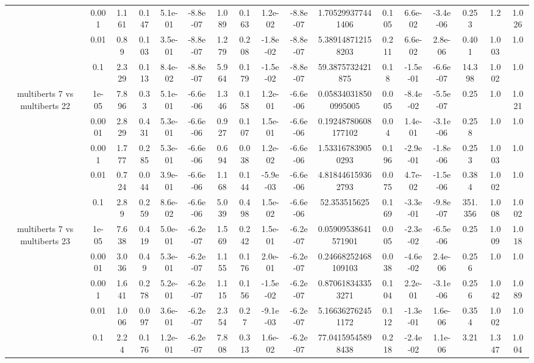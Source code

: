 \begin{tabular}{|c|c|c|c|c|c|c|c|c|c|c|c|c|c|c|c|c|}
 & 0.001 & 1.161 & 0.147 & 5.1e-01 & -8.8e-07 & 1.089 & 0.163 & 1.2e-02 & -8.8e-07 & 1.705299377441406 & 0.105 & 6.6e-02 & -3.4e-06 & 0.253 & 1.2 & 1.026 \\
 & 0.01 & 0.89 & 0.103 & 3.5e-01 & -8.8e-07 & 1.279 & 0.208 & -1.8e-02 & -8.8e-07 & 5.389148712158203 & 0.211 & 6.6e-02 & 2.8e-06 & 0.401 & 1.003 & 1.0 \\
 & 0.1 & 2.329 & 0.113 & 8.4e-02 & -8.8e-07 & 5.964 & 0.179 & -1.5e-02 & -8.8e-07 & 59.3875732421875 & 0.18 & -1.5e-01 & -6.6e-07 & 14.398 & 1.002 & 1.0 \\
\hline
\multirow{5}{*}{multiberts 7 vs multiberts 22} & 1e-05 & 7.896 & 0.33 & 5.1e-01 & -6.6e-06 & 1.346 & 0.158 & 1.2e-01 & -6.6e-06 & 0.058340318500995005 & 0.005 & -8.4e-02 & -5.5e-07 & 0.25 & 1.0 & 1.021 \\
 & 0.0001 & 2.829 & 0.431 & 5.3e-01 & -6.6e-06 & 0.927 & 0.107 & 1.5e-01 & -6.6e-06 & 0.19248780608177102 & 0.04 & 1.4e-01 & -3.1e-06 & 0.258 & 1.0 & 1.0 \\
 & 0.001 & 1.777 & 0.285 & 5.3e-01 & -6.6e-06 & 0.694 & 0.038 & 1.2e-02 & -6.6e-06 & 1.533167839050293 & 0.196 & -2.9e-01 & -1.8e-06 & 0.253 & 1.003 & 1.0 \\
 & 0.01 & 0.724 & 0.044 & 3.9e-01 & -6.6e-06 & 1.168 & 0.144 & -5.9e-03 & -6.6e-06 & 4.818446159362793 & 0.075 & 4.7e-02 & -1.5e-06 & 0.384 & 1.002 & 1.0 \\
 & 0.1 & 2.89 & 0.259 & 8.6e-02 & -6.6e-06 & 5.039 & 0.498 & 1.5e-02 & -6.6e-06 & 52.353515625 & 0.169 & -3.3e-01 & -9.8e-07 & 351.356 & 1.008 & 1.002 \\
\hline
\multirow{5}{*}{multiberts 7 vs multiberts 23} & 1e-05 & 7.638 & 0.419 & 5.0e-01 & -6.2e-07 & 1.569 & 0.242 & 1.5e-01 & -6.2e-07 & 0.05909538641571901 & 0.005 & -2.3e-02 & -6.5e-06 & 0.25 & 1.009 & 1.018 \\
 & 0.0001 & 3.036 & 0.49 & 5.3e-01 & -6.2e-07 & 1.155 & 0.176 & 2.0e-01 & -6.2e-07 & 0.24668252468109103 & 0.038 & -4.6e-02 & 2.4e-06 & 0.256 & 1.0 & 1.0 \\
 & 0.001 & 1.641 & 0.278 & 5.2e-01 & -6.2e-07 & 1.115 & 0.156 & -1.5e-02 & -6.2e-07 & 0.870618343353271 & 0.104 & 2.2e-01 & -3.1e-06 & 0.256 & 1.042 & 1.089 \\
 & 0.01 & 1.006 & 0.097 & 3.6e-01 & -6.2e-07 & 2.354 & 0.27 & -9.1e-03 & -6.2e-07 & 5.166362762451172 & 0.112 & -1.3e-01 & 1.6e-06 & 0.354 & 1.002 & 1.0 \\
 & 0.1 & 2.24 & 0.176 & 1.2e-01 & -6.2e-07 & 7.808 & 0.313 & 1.6e-02 & -6.2e-07 & 77.04159545898438 & 0.218 & -2.4e-02 & 1.1e-06 & 3.21 & 1.347 & 1.004 \\

\end{tabular}
